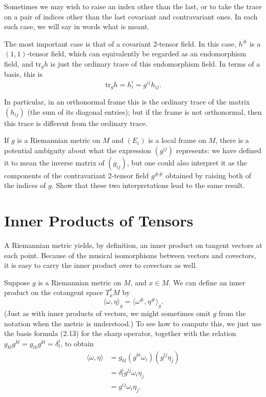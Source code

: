 Sometimes we may wish to raise an index other than the last, or to take the trace on a pair of indices other than the last covariant and contravariant ones. In each such case, we will say in words what is meant.

The most important case is that of a covariant 2-tensor field. In this case, $h^\#$ is a $(1,1)$-tensor field, which can equivalently be regarded as an endomorphism field, and $\text{tr}_g h$ is just the ordinary trace of this endomorphism field. In terms of a basis, this is
\[
\text{tr}_g h = h_i^i = g^{ij} h_{ij}.
\]

In particular, in an orthonormal frame this is the ordinary trace of the matrix $(h_{ij})$ (the sum of its diagonal entries); but if the frame is not orthonormal, then this trace is different from the ordinary trace.

\begin{exercise}
\label{exer:inverse-metric-ambiguity}
\leanok
{}
If $g$ is a Riemannian metric on $M$ and $(E_i)$ is a local frame on $M$, there is a potential ambiguity about what the expression $(g^{ij})$ represents: we have defined it to mean the inverse matrix of $(g_{ij})$, but one could also interpret it as the components of the contravariant 2-tensor field $g^{\#\#}$ obtained by raising both of the indices of $g$. Show that these two interpretations lead to the same result.
\end{exercise}

\section{Inner Products of Tensors}

A Riemannian metric yields, by definition, an inner product on tangent vectors at each point. Because of the musical isomorphisms between vectors and covectors, it is easy to carry the inner product over to covectors as well.

Suppose $g$ is a Riemannian metric on $M$, and $x \in M$. We can define an inner product on the cotangent space $T_x^* M$ by
\[
\langle \omega, \eta \rangle_g = \langle \omega^\#, \eta^\# \rangle_g.
\]
(Just as with inner products of vectors, we might sometimes omit $g$ from the notation when the metric is understood.) To see how to compute this, we just use the basis formula (2.13) for the sharp operator, together with the relation $g_{kl}g^{kl} = g_{ik}g^{kl} = \delta_l^i$, to obtain
\begin{align*}
\langle\omega, \eta\rangle &= g_{kl}(g^{ki}\omega_i)(g^{lj}\eta_j)\\
&= \delta_l^i g^{lj}\omega_i\eta_j\\
&= g^{ij}\omega_i\eta_j.
\end{align*}

